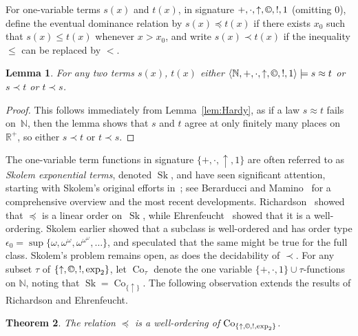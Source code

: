 \documentclass[eqnor,reqno]{amsart}
\theoremstyle{plain}
\newtheorem{thm}{Theorem}[section]
\newtheorem{lem}[thm]{Lemma}
\theoremstyle{definition}
\newcommand{\cc}{\mathbin{\textup{\copyright}}}
\newcommand{\Sk}{\operatorname{Sk}}
\newcommand{\Co}{\operatorname{Co}}
\begin{document}
For one-variable terms $s(x)$ and $t(x)$, in signature $+,\cdot,\uparrow,\cc,!,1$ (omitting $0$), define the eventual dominance relation by $s(x)\preceq t(x)$ if there exists $x_0$ such that $s(x)\leq t(x)$ whenever $x>x_0$, and write $s(x)\prec t(x)$ if the inequality $\leq$ can be replaced by $<$. 
\begin{lem}\label{lem:linearorder}
For any two  terms $s(x)$, $t(x)$ either $\langle \mathbb{N},+,\cdot,\uparrow,\cc,!,1\rangle\models s\approx t$ or $s\prec t$ or $t\prec s$.
\end{lem}
\begin{proof}
This follows immediately from Lemma~\ref{lem:Hardy}, as if a law $s\approx t$ fails on~$\mathbb{N}$, then the lemma shows that $s$ and $t$ agree at only finitely many places on $\mathbb{R}^+$, so either $s\prec t$ or $t\prec s$.
\end{proof}
The one-variable term functions in signature $\{+,\cdot,\uparrow,1\}$ are often referred to as \emph{Skolem exponential terms}, denoted $\Sk$, and have seen significant attention, starting with Skolem's original efforts in~\cite{sko}; see Berarducci and Mamino~\cite{bermam} for a comprehensive overview and the most recent developments.  
Richardson~\cite{ric} showed that $\preceq$ is a linear order on~$\Sk$, while Ehrenfeucht~\cite{ehr} showed that it is a well-ordering.  Skolem earlier showed that a subclass is well-ordered and has order type $\epsilon_0=\sup\{\omega,\omega^\omega,\omega^{\omega^\omega},\dots\}$, and speculated that the same might be true for the full class.    
Skolem's problem remains open, as does the decidability of $\prec$.  For any subset $\tau$ of $\{\uparrow,\cc,!,\exp_2\}$, let $\Co_\tau$ denote the one variable $\{+,\cdot,1\}\cup\tau$-functions on $\mathbb{N}$, noting that $\Sk=\Co_{\{\uparrow\}}$.  The following observation extends the results of Richardson and Ehrenfeucht.
\begin{thm}
The relation $\preceq$ is a well-ordering of $\Co_{\{\uparrow,\cc,!,\exp_2\}}$.
\end{thm}
\end{document}
